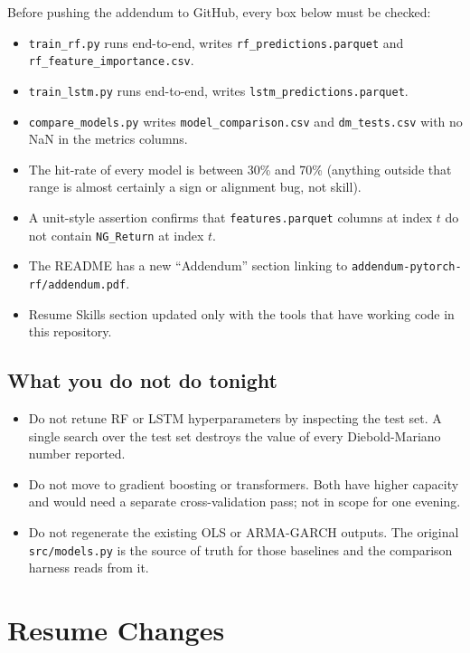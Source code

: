 \documentclass[11pt,letterpaper]{article}
\begin{document}
Before pushing the addendum to GitHub, every box below must be checked:

\begin{itemize}[leftmargin=*,nosep]
  \item[$\Box$] \texttt{train\_rf.py} runs end-to-end, writes \texttt{rf\_predictions.parquet} and \texttt{rf\_feature\_importance.csv}.
  \item[$\Box$] \texttt{train\_lstm.py} runs end-to-end, writes \texttt{lstm\_predictions.parquet}.
  \item[$\Box$] \texttt{compare\_models.py} writes \texttt{model\_comparison.csv} and \texttt{dm\_tests.csv} with no NaN in the metrics columns.
  \item[$\Box$] The hit-rate of every model is between 30\% and 70\% (anything outside that range is almost certainly a sign or alignment bug, not skill).
  \item[$\Box$] A unit-style assertion confirms that \texttt{features.parquet} columns at index $t$ do not contain \texttt{NG\_Return} at index $t$.
  \item[$\Box$] The README has a new ``Addendum'' section linking to \texttt{addendum-pytorch-rf/addendum.pdf}.
  \item[$\Box$] Resume Skills section updated only with the tools that have working code in this repository.
\end{itemize}

\subsection{What you do not do tonight}

\begin{itemize}[leftmargin=*,nosep]
  \item Do not retune RF or LSTM hyperparameters by inspecting the test set. A single search over the test set destroys the value of every Diebold-Mariano number reported.
  \item Do not move to gradient boosting or transformers. Both have higher capacity and would need a separate cross-validation pass; not in scope for one evening.
  \item Do not regenerate the existing OLS or ARMA-GARCH outputs. The original \texttt{src/models.py} is the source of truth for those baselines and the comparison harness reads from it.
\end{itemize}

\section{Resume Changes}
\end{document}
